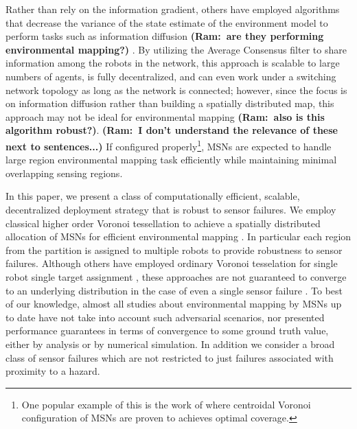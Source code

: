 \documentclass[letterpaper, 10 pt, conference]{ieeeconf}
\newcommand{\Ram}[1]{{\normalsize{\textbf{({\color{green}Ram:\ }#1)}}}}
\begin{document}
Rather than rely on the information gradient, others have employed algorithms that decrease the variance of the state estimate of the environment model to perform tasks such as information diffusion \Ram{are they performing environmental mapping?} \cite{lynch2008decentralized}. 
By utilizing the Average Consensus filter to share information among the robots in the network, this approach is scalable to large numbers of agents, is fully decentralized, and can even work under a switching network topology as long as the network is connected; however, since the focus is on information diffusion rather than building a spatially distributed map, this approach may not be ideal for environmental mapping \Ram{also is this algorithm robust?}.
\Ram{I don't understand the relevance of these next to sentences...} If configured properly\footnote{One popular example of this is the work of \cite{cortes_coverage_2004} where centroidal Voronoi configuration of MSNs are proven to  achieves optimal coverage.}, 
MSNs are expected to handle large region environmental mapping task efficiently while maintaining minimal overlapping sensing regions.





In this paper, we present a class of computationally efficient, scalable, decentralized deployment strategy that is robust to sensor failures. 
We employ classical higher order Voronoi tessellation to achieve a spatially distributed allocation of MSNs for efficient environmental mapping \cite{shamos1975closest}.
In particular each region from the partition is assigned to multiple robots to provide robustness to sensor failures.
Although others have employed ordinary Voronoi tesselation for single robot single target assignment \cite{cortez2011information}, these approaches are not guaranteed to converge to an underlying distribution in the case of even a single sensor failure \cite{hutchinson_robust_2012}.
To best of our knowledge, almost all studies about environmental mapping by MSNs up to date have not take into account such adversarial scenarios, nor presented performance guarantees in terms of convergence to some ground truth value, either by analysis or by numerical simulation.
In addition we consider a broad class of sensor failures which are not restricted to just failures associated with proximity to a hazard.
\end{document}
